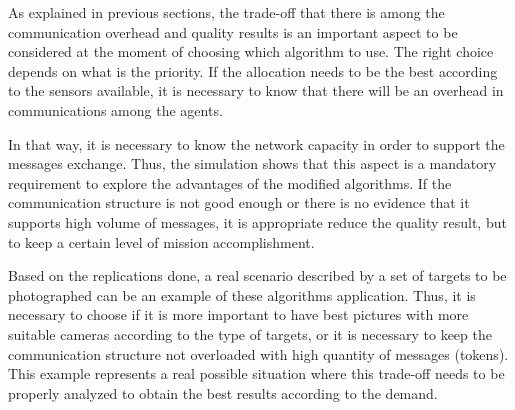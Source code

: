 As explained in previous sections, the trade-off that there is among the communication overhead and quality results is an important aspect to be considered at the moment of choosing which algorithm to use. The right choice depends on what is the priority. If the allocation needs to be the best according to the sensors available, it is necessary to know that there will be an overhead in communications among the agents. 

In that way, it is necessary to know the network capacity in order to support the messages exchange. Thus, the simulation shows that this aspect is a mandatory requirement to explore the advantages of the modified algorithms. If the communication structure is not good enough or there is no evidence that it supports high volume of messages, it is appropriate reduce the quality result, but to keep a certain level of mission accomplishment.

Based on the replications done, a real scenario described by a set of targets to be photographed can be an example of these algorithms application. Thus, it is necessary to choose if it is more important to have best pictures with more suitable cameras according to the type of targets, or it is necessary to keep the communication structure not overloaded with high quantity of messages (tokens). This example represents a real possible situation where this trade-off needs to be properly analyzed to obtain the best results according to the demand.
